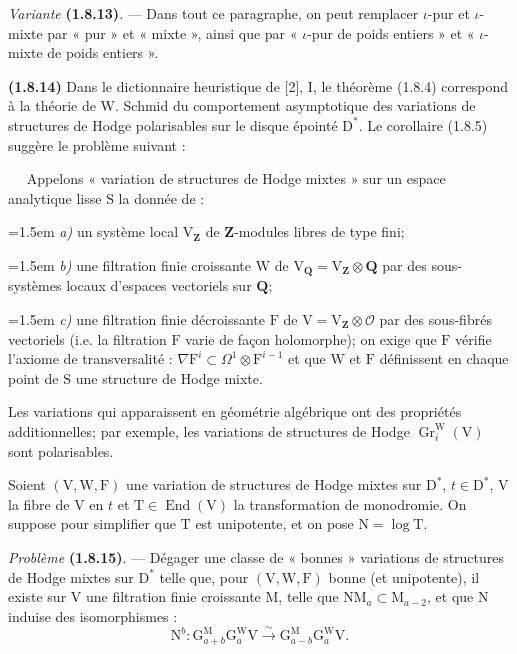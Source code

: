 \documentclass[11pt,leqno]{article}
\newcommand{\Page}[1]{\ifvmode\noindent\else\unskip\ \fi{\footnotesize\textcolor{gray}{[p.\,#1]}}\ \ignorespaces}
\begin{document}
\textit{Variante} \textbf{(1.8.13)}. — Dans tout ce paragraphe, on peut remplacer \(\iota\)-pur et \(\iota\)-mixte par « pur » et « mixte », ainsi que par « \(\iota\)-pur de poids entiers » et « \(\iota\)-mixte de poids entiers ».

\textbf{(1.8.14)} Dans le dictionnaire heuristique de [2], I, le théorème (1.8.4) correspond à la théorie de W. Schmid du comportement asymptotique des variations de structures de Hodge polarisables sur le disque épointé \(\mathrm{D}^*\). Le corollaire (1.8.5) suggère le problème suivant :

\Page{179}
Appelons « variation de structures de Hodge mixtes » sur un espace analytique lisse \(\mathrm{S}\) la donnée de :

\noindent\hangindent=1.5em
\textit{a)} un système local \(\mathrm{V}_{\mathbf{Z}}\) de \(\mathbf{Z}\)-modules libres de type fini;

\noindent\hangindent=1.5em
\textit{b)} une filtration finie croissante \(\mathrm{W}\) de \(\mathrm{V}_{\mathbf{Q}}=\mathrm{V}_{\mathbf{Z}}\otimes\mathbf{Q}\) par des sous-systèmes locaux d’espaces vectoriels sur \(\mathbf{Q}\);

\noindent\hangindent=1.5em
\textit{c)} une filtration finie décroissante \(\mathrm{F}\) de \(\mathrm{V}=\mathrm{V}_{\mathbf{Z}}\otimes\mathscr{O}\) par des sous-fibrés vectoriels (i.e. la filtration \(\mathrm{F}\) varie de façon holomorphe); on exige que \(\mathrm{F}\) vérifie l’axiome de transversalité : \(\nabla\mathrm{F}^i\subset\Omega^1\otimes\mathrm{F}^{i-1}\) et que \(\mathrm{W}\) et \(\mathrm{F}\) définissent en chaque point de \(\mathrm{S}\) une structure de Hodge mixte.

\noindent
Les variations qui apparaissent en géométrie algébrique ont des propriétés additionnelles; par exemple, les variations de structures de Hodge \(\operatorname{Gr}_i^{\mathrm{W}}(\mathrm{V})\) sont polarisables.

Soient \((\mathrm{V},\mathrm{W},\mathrm{F})\) une variation de structures de Hodge mixtes sur \(\mathrm{D}^*\), \(t\in\mathrm{D}^*\), \(\mathrm{V}\) la fibre de \(\mathrm{V}\) en \(t\) et \(\mathrm{T}\in\operatorname{End}(\mathrm{V})\) la transformation de monodromie. On suppose pour simplifier que \(\mathrm{T}\) est unipotente, et on pose \(\mathrm{N}=\log\mathrm{T}\).

\textit{Problème} \textbf{(1.8.15)}. — Dégager une classe de « bonnes » variations de structures de Hodge mixtes sur \(\mathrm{D}^*\) telle que, pour \((\mathrm{V},\mathrm{W},\mathrm{F})\) bonne (et unipotente), il existe sur \(\mathrm{V}\) une filtration finie croissante \(\mathrm{M}\), telle que \(\mathrm{N}\mathrm{M}_a\subset\mathrm{M}_{a-2}\), et que \(\mathrm{N}\) induise des isomorphismes :
\[
\mathrm{N}^b:
\mathrm{G}_{a+b}^{\mathrm{M}}\mathrm{G}_a^{\mathrm{W}}\mathrm{V}
\xrightarrow{\sim}
\mathrm{G}_{a-b}^{\mathrm{M}}\mathrm{G}_a^{\mathrm{W}}\mathrm{V}.
\]
\end{document}
